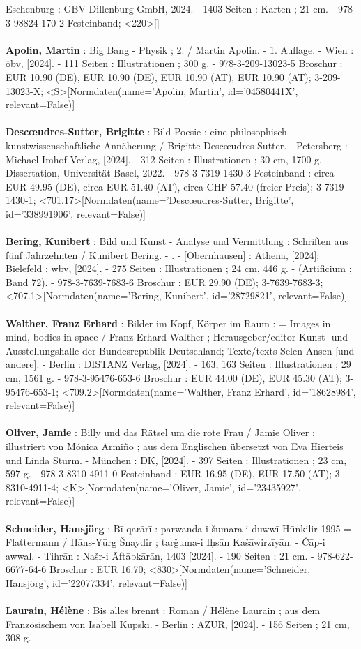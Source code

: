 \documentclass{article}
\begin{document}
\begin{multicols}{3}
Eschenburg : GBV Dillenburg GmbH, 2024. - 1403 Seiten : Karten ; 21 cm. - 978-3-98824-170-2 Festeinband; <220>[]\\\\\textbf{Apolin, Martin} : Big Bang - Physik ; 2. / Martin Apolin. - 1. Auflage. - Wien : öbv, [2024]. - 111 Seiten : Illustrationen ; 300 g. - 978-3-209-13023-5 Broschur : EUR 10.90 (DE), EUR 10.90 (DE), EUR 10.90 (AT), EUR 10.90 (AT); 3-209-13023-X; <S>[Normdaten(name='Apolin, Martin', id='04580441X', relevant=False)]\\\\\textbf{Descœudres-Sutter, Brigitte} : Bild-Poesie : eine philosophisch-kunstwissenschaftliche Annäherung / Brigitte Descœudres-Sutter. - Petersberg : Michael Imhof Verlag, [2024]. - 312 Seiten : Illustrationen ; 30 cm, 1700 g. - Dissertation, Universität Basel, 2022. - 978-3-7319-1430-3 Festeinband : circa EUR 49.95 (DE), circa EUR 51.40 (AT), circa CHF 57.40 (freier Preis); 3-7319-1430-1; <701.17>[Normdaten(name='Descœudres-Sutter, Brigitte', id='338991906', relevant=False)]\\\\\textbf{Bering, Kunibert} : Bild und Kunst - Analyse und Vermittlung : Schriften aus fünf Jahrzehnten / Kunibert Bering. - . - [Obernhausen] : Athena, [2024]; Bielefeld : wbv, [2024]. - 275 Seiten : Illustrationen ; 24 cm, 446 g. - (Artificium ; Band 72). - 978-3-7639-7683-6 Broschur : EUR 29.90 (DE); 3-7639-7683-3; <707.1>[Normdaten(name='Bering, Kunibert', id='28729821', relevant=False)]\\\\\textbf{Walther, Franz Erhard} : Bilder im Kopf, Körper im Raum : = Images in mind, bodies in space / Franz Erhard Walther ; Herausgeber/editor Kunst- und Ausstellungshalle der Bundesrepublik Deutschland; Texte/texts Selen Ansen [und andere]. - Berlin : DISTANZ Verlag, [2024]. - 163, 163 Seiten : Illustrationen ; 29 cm, 1561 g. - 978-3-95476-653-6 Broschur : EUR 44.00 (DE), EUR 45.30 (AT); 3-95476-653-1; <709.2>[Normdaten(name='Walther, Franz Erhard', id='18628984', relevant=False)]\\\\\textbf{Oliver, Jamie} : Billy und das Rätsel um die rote Frau / Jamie Oliver ; illustriert von Mónica Armiño ; aus dem Englischen übersetzt von Eva Hierteis und Linda Sturm. - München : DK, [2024]. - 397 Seiten : Illustrationen ; 23 cm, 597 g. - 978-3-8310-4911-0 Festeinband : EUR 16.95 (DE), EUR 17.50 (AT); 3-8310-4911-4; <K>[Normdaten(name='Oliver, Jamie', id='23435927', relevant=False)]\\\\\textbf{Schneider, Hansjörg} : Bī-qarārī : parwanda-i šumara-i duwwī Hūnkilir 1995 = Flattermann / Hāns-Yūrg Šnaydir ; tarǧuma-i Iḥsān Kašāwirzīyān. - Čāp-i awwal. - Tihrān : Našr-i Āftābkārān, 1403 [2024]. - 190 Seiten ; 21 cm. - 978-622-6677-64-6 Broschur : EUR 16.70; <830>[Normdaten(name='Schneider, Hansjörg', id='22077334', relevant=False)]\\\\\textbf{Laurain, Hélène} : Bis alles brennt : Roman / Hélène Laurain ; aus dem Französischem von Isabell Kupski. - Berlin : AZUR, [2024]. - 156 Seiten ; 21 cm, 308 g. - 
\end{multicols}
\end{document}
